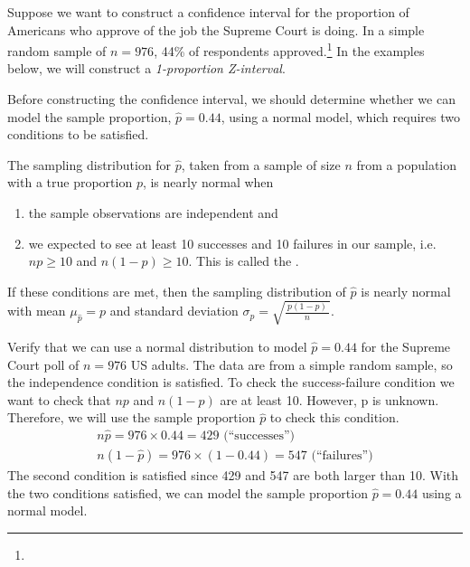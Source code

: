 Suppose we want to construct a confidence interval for the proportion of Americans who approve of the job the Supreme Court is doing. In a simple random sample of $n = 976$, 44\% of respondents approved.\footnote{} In the examples below, we will construct a \emph{1-proportion Z-interval}.


Before constructing the confidence interval, we should determine whether we can model the sample proportion, $\hat{p} = 0.44$, using a normal model, which requires two conditions to be satisfied.

\begin{termBox}{
The sampling distribution for $\hat{p}$, taken from a sample of size $n$ from a population with a true proportion $p$, is nearly normal when
\begin{enumerate}
\item the sample observations are independent and
\item we expected to see at least 10 successes and 10 failures in our sample, i.e. $np\geq10$ and $n(1-p)\geq10$. This is called the .
\end{enumerate}
If these conditions are met, then the sampling distribution of $\hat{p}$ is nearly normal with mean $\mu_{\hat{p}}=p$ and standard deviation $\sigma_{\hat{p}} = \sqrt{\frac{\ p(1-p)\ }{n}}$.}
\end{termBox}

\begin{example}{Verify that we can use a normal distribution to model $\hat{p}=0.44$ for the Supreme Court poll of $n = 976$ US adults.}
\label{supremeCourtCIConditionsExample}
The data are from a simple random sample, so the independence condition is satisfied. To check the success-failure condition we want to check that $np$ and $n(1-p)$ are at least 10. However, p is unknown. Therefore, we will use the sample proportion $\hat{p}$ to check this condition.
\begin{align*}
n\hat{p} = 976 \times 0.44 = 429\text{ (``successes'')} \\
 n(1-\hat{p}) = 976 \times (1 - 0.44) = 547\text{ (``failures'')}
\end{align*}
The second condition is satisfied since 429 and 547 are both larger than 10. With the two conditions satisfied, we can model the sample proportion $\hat{p} = 0.44$ using a normal model.
\end{example}

